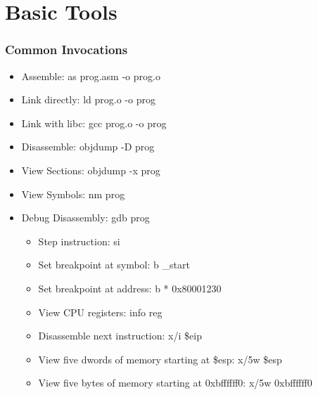\documentclass[11pt,xcolor=dvipsnames]{beamer}
\begin{document}
\section{Basic Tools}
\begin{frame}[fragile,t]
\frametitle{Common Invocations}
\begin{itemize}
    \item Assemble: {\ttfamily as prog.asm -o prog.o}
    \item Link directly: {\ttfamily ld prog.o -o prog}
    \item Link with libc: {\ttfamily gcc prog.o -o prog}
    \item Disassemble: {\ttfamily objdump -D prog}
    \item View Sections: {\ttfamily objdump -x prog}
    \item View Symbols: {\ttfamily nm prog}
    \item Debug Disassembly: {\ttfamily gdb prog}
    \begin{itemize}
        \item Step instruction: {\ttfamily si}
        \item Set breakpoint at symbol: {\ttfamily b \_start}
        \item Set breakpoint at address: {\ttfamily b * 0x80001230}
        \item View CPU registers: {\ttfamily info reg}
        \item Disassemble next instruction: {\ttfamily x/i \$eip}
        \item View five dwords of memory starting at {\ttfamily \$esp}: {\ttfamily x/5w \$esp}
        \item View five bytes of memory starting at {\ttfamily 0xbffffff0}: {\ttfamily x/5w 0xbffffff0}
    \end{itemize}
\end{itemize}
\end{frame}
\end{document}
